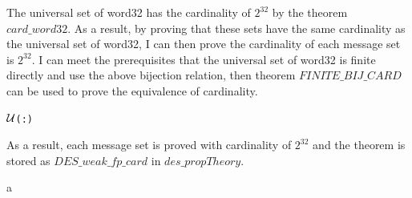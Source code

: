 \documentclass{article}
\begin{document}
The universal set of word32 has the cardinality of $2^{32}$ by the theorem \\
$card\_word32$. As a result, by proving that
these sets have the same cardinality as the universal set of word32, I can then prove the cardinality of each message set
is $2^{32}$. I can meet the prerequisites that the universal set of word32 is finite directly and use the above
bijection relation, then theorem $FINITE\_BIJ\_CARD$ can be used to prove the equivalence of cardinality.

\begin{alltt}
   \HOLTokenTurnstile{}  \ensuremath{{\cal{U}}}(:) \HOLSymConst{=}  \HOLSymConst{\HOLTokenExp{}} 
\end{alltt}

\begin{alltt}
   \HOLTokenTurnstile{}   \HOLSymConst{\HOLTokenConj{}}     \HOLSymConst{\HOLTokenImp{}}   \HOLSymConst{=}  
\end{alltt}

As a result, each message set is proved with cardinality of $2^{32}$ and the theorem is stored as
$DES\_weak\_fp\_card$ in $des\_propTheory$.

\begin{alltt}
   \HOLTokenTurnstile{}    \HOLSymConst{\HOLTokenImp{}}   \HOLSymConst{=}  \HOLSymConst{\HOLTokenExp{}} 
\end{alltt}


   a
\end{document}
